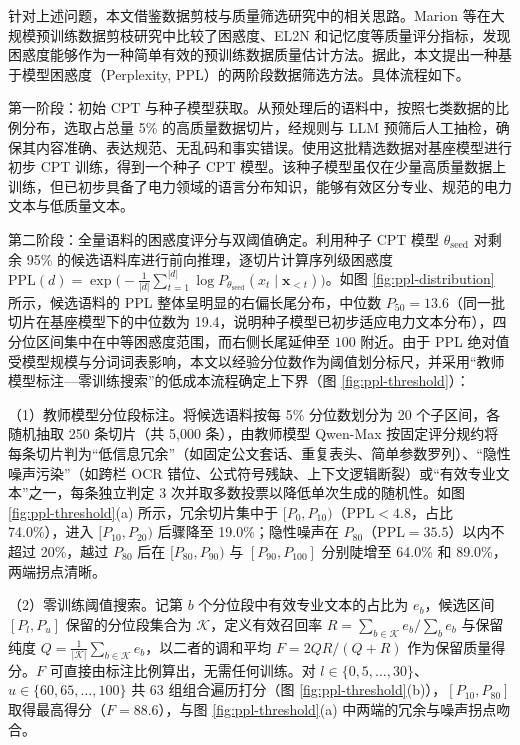 \documentclass[fontset=fandol,type=master,campus=shenzhen,etitleauto=true]{hithesisbook}
\begin{document}
针对上述问题，本文借鉴数据剪枝与质量筛选研究中的相关思路。Marion 等在大规模预训练数据剪枝研究中比较了困惑度、EL2N 和记忆度等质量评分指标，发现困惑度能够作为一种简单有效的预训练数据质量估计方法\cite{ref58}。据此，本文提出一种基于模型困惑度（Perplexity, PPL）的两阶段数据筛选方法。具体流程如下。

第一阶段：初始 CPT 与种子模型获取。从预处理后的语料中，按照七类数据的比例分布，选取占总量 5\% 的高质量数据切片，经规则与 LLM 预筛后人工抽检，确保其内容准确、表达规范、无乱码和事实错误。使用这批精选数据对基座模型进行初步 CPT 训练，得到一个种子 CPT 模型。该种子模型虽仅在少量高质量数据上训练，但已初步具备了电力领域的语言分布知识，能够有效区分专业、规范的电力文本与低质量文本。

第二阶段：全量语料的困惑度评分与双阈值确定。利用种子 CPT 模型 $\theta_{\text{seed}}$ 对剩余 95\% 的候选语料库进行前向推理，逐切片计算序列级困惑度 $\text{PPL}(d) = \exp\bigl(-\frac{1}{|d|}\sum_{t=1}^{|d|} \log P_{\theta_{\text{seed}}}(x_t \mid \mathbf{x}_{<t})\bigr)$。如图 \ref{fig:ppl-distribution} 所示，候选语料的 PPL 整体呈明显的右偏长尾分布，中位数 $P_{50} = 13.6$（同一批切片在基座模型下的中位数为 19.4，说明种子模型已初步适应电力文本分布），四分位区间集中在中等困惑度范围，而右侧长尾延伸至 $100$ 附近。由于 PPL 绝对值受模型规模与分词词表影响，本文以经验分位数作为阈值划分标尺，并采用“教师模型标注—零训练搜索”的低成本流程确定上下界（图 \ref{fig:ppl-threshold}）：

（1）教师模型分位段标注。将候选语料按每 5\% 分位数划分为 20 个子区间，各随机抽取 250 条切片（共 5,000 条），由教师模型 Qwen-Max 按固定评分规约将每条切片判为“低信息冗余”（如固定公文套话、重复表头、简单参数罗列）、“隐性噪声污染”（如跨栏 OCR 错位、公式符号残缺、上下文逻辑断裂）或“有效专业文本”之一，每条独立判定 3 次并取多数投票以降低单次生成的随机性。如图 \ref{fig:ppl-threshold}(a) 所示，冗余切片集中于 $[P_0, P_{10})$（$\text{PPL} < 4.8$，占比 74.0\%），进入 $[P_{10}, P_{20})$ 后骤降至 19.0\%；隐性噪声在 $P_{80}$（$\text{PPL} = 35.5$）以内不超过 20\%，越过 $P_{80}$ 后在 $[P_{80}, P_{90})$ 与 $[P_{90}, P_{100}]$ 分别陡增至 64.0\% 和 89.0\%，两端拐点清晰。

（2）零训练阈值搜索。记第 $b$ 个分位段中有效专业文本的占比为 $e_b$，候选区间 $[P_l, P_u]$ 保留的分位段集合为 $\mathcal{K}$，定义有效召回率 $R = \sum_{b \in \mathcal{K}} e_b / \sum_{b} e_b$ 与保留纯度 $Q = \frac{1}{|\mathcal{K}|}\sum_{b \in \mathcal{K}} e_b$，以二者的调和平均 $F = 2QR/(Q+R)$ 作为保留质量得分。$F$ 可直接由标注比例算出，无需任何训练。对 $l \in \{0, 5, \dots, 30\}$、$u \in \{60, 65, \dots, 100\}$ 共 63 组组合遍历打分（图 \ref{fig:ppl-threshold}(b)），$[P_{10}, P_{80}]$ 取得最高得分（$F = 88.6$），与图 \ref{fig:ppl-threshold}(a) 中两端的冗余与噪声拐点吻合。
\end{document}

